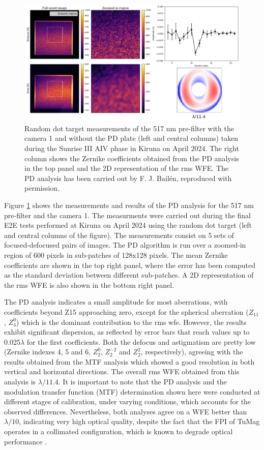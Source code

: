 \begin{figure}[t]
    \includegraphics[width=\textwidth]{figures/TuMag/PD_e2e.pdf}
    \caption{Random dot target measurements of the 517 nm pre-filter with the camera 1 and without the PD plate (left and central columns) taken during the Sunrise III AIV phase in Kiruna on April 2024. The right column shows the Zernike coefficients obtained from the PD analysis in the top panel and the 2D representation of the rms WFE. The PD analysis has been carried out by F. J. Bailén, reproduced with permission.}
      \label{tumag : PD}
\end{figure}

Figure \ref{tumag : PD} shows the measurements and results of the PD analysis for the 517 nm pre-filter and the camera 1. The measurments were carried out during the final E2E tests performed at Kiruna on April 2024 using the random dot target (left and central columns of the figure). The measurements consist on 5 sets of focused-defocused pairs of images. The PD algorithm is run over a zoomed-in region of 600 pixels in sub-patches of 128x128 pixels. The mean Zernike coefficients are shown in the top right panel, where the error has been computed as the standard deviation between different sub-patches. A 2D representation of the rms WFE is also shown in the bottom right panel. 

The PD analysis indicates a small amplitude for most aberrations, with coefficients beyond Z15 approaching zero, except for the spherical aberration ($Z_{11}$, $Z_4 ^0$) which is the dominant contribution to the rms wfe. However, the results exhibit significant dispersion, as reflected by error bars that reach values up to 0.025$\lambda$ for the first coefficients. Both the defocus and astigmatism are pretty low (Zernike indexes 4, 5 and 6, $Z _ 2 ^0$, $Z _ 2 ^{-2}$ and $Z _ 2 ^2$, respectively), agreeing with the results obtained from the MTF analysis which showed a good resolution in both vertical and horizontal directions. The overall rms WFE obtained from this analysis is $\lambda / 11.4$. It is important to note that the PD analysis and the modulation transfer function (MTF) determination shown here were conducted at different stages of calibration, under varying conditions, which accounts for the observed differences. Nevertheless, both analyses agree on a WFE better than $\lambda / 10$, indicating very high optical quality, despite the fact that the FPI of TuMag operates in a collimated configuration, which is known to degrade optical performance \citep{ghosts-etalon}.

